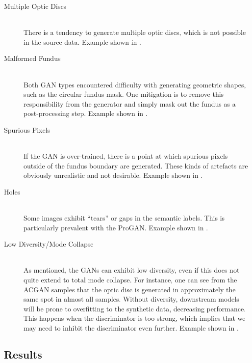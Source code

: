 \begin{description}
    \item[Multiple Optic Discs] \hfill \\ 
    There is a tendency to generate multiple optic discs, which is not possible in the source data. 
    Example shown in .
    
    \item[Malformed Fundus] \hfill \\ 
    Both GAN types encountered difficulty with generating geometric shapes, such as the circular fundus mask.
    One mitigation is to remove this responsibility from the generator and simply mask out the fundus as a post-processing step.
    Example shown in .
    
    \item[Spurious Pixels] \hfill \\ 
    If the GAN is over-trained, there is a point at which spurious pixels outside of the fundus boundary are generated.
    These kinds of artefacts are obviously unrealistic and not desirable.
    Example shown in .
    
    \item[Holes] \hfill \\ 
    Some images exhibit ``tears'' or gaps in the semantic labels. This is particularly prevalent with the ProGAN. 
    Example shown in .
    
    \item[Low Diversity/Mode Collapse] \hfill \\ 
    As mentioned, the GANs can exhibit low diversity, even if this does not quite extend to total mode collapse.
    For instance, one can see from the ACGAN samples that the optic disc is generated in approximately the same spot in almost all samples.
    Without diversity, downstream models will be prone to overfitting to the synthetic data, decreasing performance. 
    This happens when the discriminator is too strong, which implies that we may need to inhibit the discriminator even further.
    Example shown in .
\end{description}

\subsection{Results}

